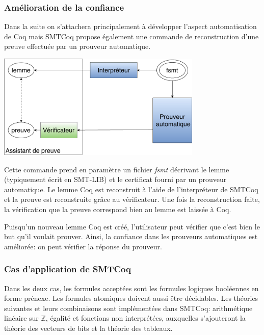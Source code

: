 \documentclass[11pt]{article}
\begin{document}
\subsubsection{Amélioration de la confiance} \label{smtcoq_confiance}

Dans la suite on s'attachera principalement à développer l'aspect automatisation de Coq mais SMTCoq propose également une commande de reconstruction d'une preuve effectuée par un prouveur automatique.

\begin{center}
\includegraphics[height=5cm]{Confiance.pdf}
\end{center}

Cette commande prend en paramètre un fichier \textit{fsmt} décrivant le lemme (typiquement écrit en SMT-LIB) et le certificat fourni par un prouveur automatique. Le lemme Coq est reconstruit à l'aide de l'interpréteur de SMTCoq et la preuve est reconstruite grâce au vérificateur. Une fois la reconstruction faite, la vérification que la preuve correspond bien au lemme est laissée à Coq. \medbreak

Puisqu'un nouveau lemme Coq est créé, l'utilisateur peut vérifier que c'est bien le but qu'il voulait prouver. Ainsi, la confiance dans les prouveurs automatiques est améliorée: on peut vérifier la réponse du prouveur.


\subsubsection{Cas d'application de SMTCoq} \label{cas_application}

Dans les deux cas, les formules acceptées sont les formules logiques booléennes en forme prénexe. Les formules atomiques doivent aussi être décidables. Les théories suivantes et leurs combinaisons sont implémentées dans SMTCoq: arithmétique linéaire sur $\mathbb{Z}$, égalité et fonctions non interprétées, auxquelles s'ajouteront la théorie des vecteurs de bits et la théorie des tableaux. 
\end{document}
